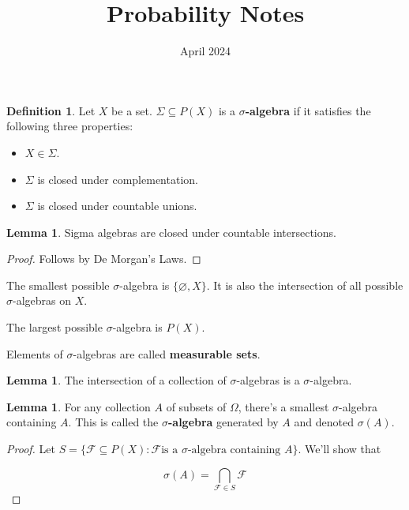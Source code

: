 \documentclass{article}
\title{Probability Notes}
\date{April 2024}
\theoremstyle{definition}
\newtheorem{definition}{Definition}
\newtheorem{lemma}[theorem]{Lemma}
\begin{document}
\maketitle

\begin{definition}
    Let $X$ be a set. $\Sigma \subseteq P(X)$ is a \textbf{$\sigma$-algebra} if it satisfies
    the following three properties:

    \begin{itemize}
        \item $X \in \Sigma$.
        \item $\Sigma$ is closed under complementation.
        \item $\Sigma$ is closed under countable unions.
    \end{itemize}
\end{definition}

\begin{lemma}
    Sigma algebras are closed under countable intersections.
\end{lemma}
\begin{proof}
    Follows by De Morgan's Laws.
\end{proof}

The smallest possible $\sigma$-algebra is $\{\varnothing, X\}$. It
is also the intersection of all possible $\sigma$-algebras on $X$.

The largest possible $\sigma$-algebra is $P(X)$.

Elements of $\sigma$-algebras are called \textbf{measurable sets}.

\begin{lemma}
    The intersection of a collection of $\sigma$-algebras is a $\sigma$-algebra.
\end{lemma}

\begin{lemma}
    For any collection $A$ of subsets of $\Omega$, there's a smallest $\sigma$-algebra
    containing $A$. This is called the \textbf{$\sigma$-algebra} generated by $A$ and denoted $\sigma(A)$.
\end{lemma}
\begin{proof}
    Let $S = \{ \mathcal{F} \subseteq P(X) : \mathcal{F} \text{is a $\sigma$-algebra containing } A\}$.
    We'll show that

    \[ \sigma(A) = \bigcap_{\mathcal{F} \in S} \mathcal{F}\]
    
    
\end{proof}
\end{document}
